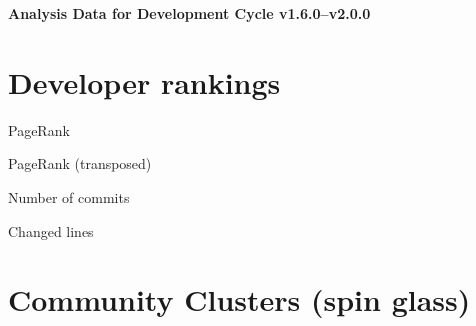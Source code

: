 \documentclass{article}
\begin{document}
\setlength{\parindent}{0pt}
\begin{center}
\begin{Large}
\textbf{Analysis Data for Development Cycle v1.6.0--v2.0.0}
\end{Large}
\end{center}
\section{Developer rankings}
\begin{small}\renewcommand{\tabcolsep}{1pt}
\begin{minipage}{0.5\linewidth}
PageRank\\

\end{minipage}%
\begin{minipage}{0.5\linewidth}
PageRank (transposed)\\

\end{minipage}

\renewcommand{\tabcolsep}{5pt}
\begin{minipage}{0.5\linewidth}
Number of commits\\

\end{minipage}%
\begin{minipage}{0.5\linewidth}
Changed lines\\

\end{minipage}
\end{small}
\newpage\section{Community Clusters (spin glass)}
\end{document}
